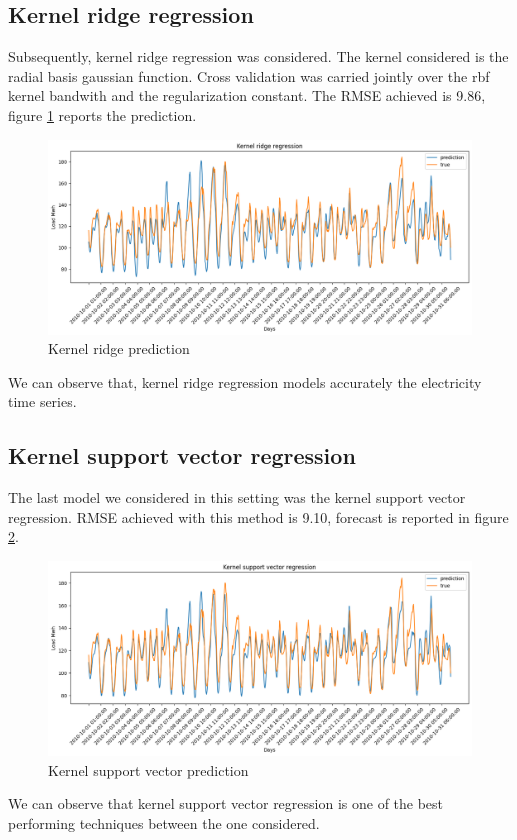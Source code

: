 \subsection{Kernel ridge regression}
Subsequently, kernel ridge regression was considered. The kernel considered is the radial basis gaussian function.
Cross validation was carried jointly over the rbf kernel bandwith and the regularization constant.
The RMSE achieved is 9.86, figure \ref{fig:krnridge_price} reports the prediction.
\begin{figure}[!h]
    \includegraphics[width=\textwidth]{images/krnridge_price.png}
    \caption{Kernel ridge prediction}
    \label{fig:krnridge_price}
\end{figure}
We can observe that, kernel ridge regression models accurately the electricity time series.

\subsection{Kernel support vector regression}
The last model we considered in this setting was the kernel support vector regression.
RMSE achieved with this method is 9.10, forecast is reported in figure \ref{fig:krnsvr_price}.

\begin{figure}[!h]
    \includegraphics[width=\textwidth]{images/krnsvr_price.png}
    \caption{Kernel support vector prediction}
    \label{fig:krnsvr_price}
\end{figure}
We can observe that kernel support vector regression is one of the best performing techniques between the one considered.

